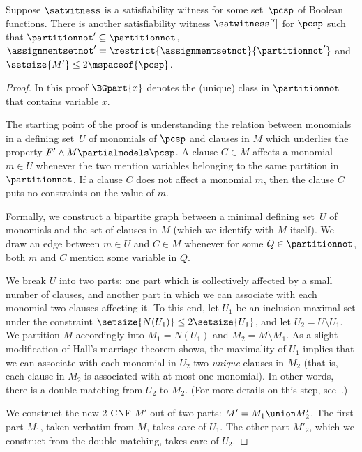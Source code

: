 \documentclass{toc}
\begin{document}
\begin{lemma}
  \label{lem:locality}
  Suppose $\satwitness$ is a satisfiability witness for some %
  set~$\pcsp$ of Boolean functions.
  There is another satisfiability witness $\satwitness[']$ for $\pcsp$ such that $\partitionnot' \subseteq \partitionnot$, $\assignmentsetnot' = \restrict{\assignmentsetnot}{\partitionnot'}$ and $\setsize{M'} \leq 2\mspaceof{\pcsp}$.
\end{lemma}
\begin{proof}
In this proof $\BGpart{x}$ denotes the (unique) class in
$\partitionnot$ that contains variable $x$.

The starting point of the proof is understanding the relation between monomials in a %
defining set~$U$ of monomials
of $\pcsp$ and clauses in $M$ which underlies the property $F'\land M \partialmodels \pcsp$. A clause $C \in M$ affects a monomial $m \in U$ whenever the two mention variables belonging to the same partition in $\partitionnot$. If a clause $C$ does not affect a monomial $m$, then the clause $C$ puts no constraints on the value of $m$.

Formally, we construct a bipartite graph between a minimal %
defining set~$U$ of monomials
and the set of clauses in $M$ (which we identify with $M$ itself). We draw an edge between $m \in U$ and $C \in M$ whenever for some $Q \in \partitionnot$, both $m$ and $C$ mention some variable in $Q$.

We break $U$ into two parts: one part which is collectively affected by a small number of clauses, and another part in which we can associate with each monomial two clauses affecting it. To this end, let $U_1$ be an inclusion-maximal set under the constraint $\setsize{N(U_1)}\leq 2\setsize{U_1}$, and let $U_2=U\setminus U_1$. We partition $M$ accordingly into $M_1 = N(U_1)$ and $M_2 = M \setminus M_1$. As a slight modification of Hall's marriage theorem shows, the maximality of $U_1$ implies that we can associate with each monomial in $U_2$ two \emph{unique} clauses in $M_2$ (that is, each clause in $M_2$ is associated with at most one monomial). In other words, there is a double matching from $U_2$ to $M_2$. (For more details on this step, see~\cite{ABRW02SpaceComplexity,FLNRT15SpaceCplx,BG15Framework}.)

%

We construct the new 2-CNF $M'$ out of two parts: $M' = M_1 \union M'_2$. The first part $M_1$, taken verbatim from $M$, takes care of $U_1$. The other part $M'_2$, which we construct from the double matching, takes care of $U_2$.


\end{proof}
\end{document}
